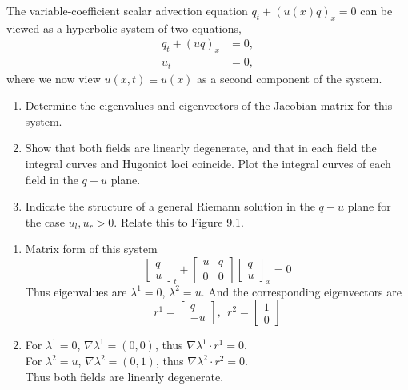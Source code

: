 \documentclass[11pt]{article}
\begin{document}
\begin{enumerate}
		The variable-coefficient scalar advection equation $q_t+(u(x)q)_x=0$ can be viewed as a hyperbolic system of two equations,
		\begin{align*}
		q_t+(uq)_x &=0,\\
		u_t &=0,
		\end{align*}
		where we now view $u(x,t)\equiv u(x)$ as a second component of the system.
		\begin{enumerate}
			\item
				Determine the eigenvalues and eigenvectors of the Jacobian matrix for this system.
			\item
				Show that both fields are linearly degenerate, and that in each field the integral curves and Hugoniot loci coincide. Plot the integral curves of each field in the $q-u$ plane.
			\item
				Indicate the structure of a general Riemann solution in the $q-u$ plane for the case $u_l, u_r>0$. Relate this to Figure 9.1.
		\end{enumerate}

		
		\vskip 5pt
        \vskip 5pt
        
        \begin{enumerate}
        	\item
        		Matrix form of this system
        		\[
        		\begin{bmatrix}q\\u\end{bmatrix}_t+
        		\begin{bmatrix}u&q\\0&0\end{bmatrix}
        		\begin{bmatrix}q\\u\end{bmatrix}_x=0
        		\]
        		Thus eigenvalues are $\lambda^1=0$, $\lambda^2=u$. And the corresponding eigenvectors are 
        		\[
        		r^1=\begin{bmatrix}q\\-u\end{bmatrix}, \ \ 
        		r^2=\begin{bmatrix}1\\0\end{bmatrix}
        		\]
        	\item
        		For $\lambda^1=0$, $\nabla \lambda^1 =(0,0)$, thus $\nabla \lambda^1 \cdot r^1=0$.\\
        		For $\lambda^2=u$, $\nabla \lambda^2 =(0,1)$, thus $\nabla \lambda^2 \cdot r^2=0$.\\
        		Thus both fields are linearly degenerate.\\
        		

\end{enumerate}
\end{enumerate}
\end{document}
